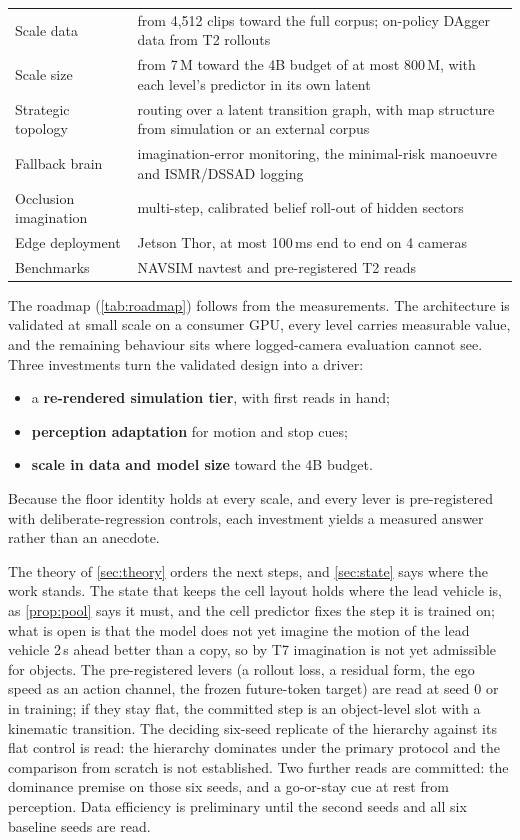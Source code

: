 \documentclass[10pt,twocolumn]{article}
\theoremstyle{remark}
\begin{document}
\begin{table}[t]
\begin{tabularx}{\columnwidth}{@{}>{\raggedright\arraybackslash}p{24mm}>{\raggedright\arraybackslash}X@{}}
Scale data & from 4,512 clips toward the full corpus; on-policy DAgger data from T2 rollouts \\
Scale size & from 7\,M toward the 4B budget of at most 800\,M, with each level's predictor in its own latent \\
Strategic topology & routing over a latent transition graph, with map structure from simulation or an external corpus \\
Fallback brain & imagination-error monitoring, the minimal-risk manoeuvre and ISMR/DSSAD logging \\
Occlusion imagination & multi-step, calibrated belief roll-out of hidden sectors \\
Edge deployment & Jetson Thor, at most 100\,ms end to end on 4 cameras \\
Benchmarks & NAVSIM navtest and pre-registered T2 reads \\
\bottomrule
\end{tabularx}
\end{table}

The roadmap (\cref{tab:roadmap}) follows from the measurements. The architecture is validated at small scale on a consumer GPU,
every level carries measurable value, and the remaining behaviour sits where logged-camera evaluation cannot see. Three investments
turn the validated design into a driver:
\begin{itemize}
  \item a \textbf{re-rendered simulation tier}, with first reads in hand;
  \item \textbf{perception adaptation} for motion and stop cues;
  \item \textbf{scale in data and model size} toward the 4B budget.
\end{itemize}
Because the floor identity holds at every scale, and every lever is pre-registered with deliberate-regression controls, each
investment yields a measured answer rather than an anecdote.

The theory of \cref{sec:theory} orders the next steps, and \cref{sec:state} says where the work stands. The state that keeps the
cell layout holds where the lead vehicle is, as \cref{prop:pool} says it must, and the cell predictor fixes the step it is trained
on; what is open is that the model does not yet imagine the motion of the lead vehicle 2\,s ahead better than a copy, so by T7
imagination is not yet admissible for objects. The pre-registered levers (a rollout loss, a residual form, the ego speed as an
action channel, the frozen future-token target) are read at seed 0 or in training; if they stay flat, the committed step is an
object-level slot with a kinematic transition. The deciding six-seed replicate of the hierarchy against its flat control is read: the hierarchy dominates under the primary
protocol and the comparison from scratch is not established. Two further reads are committed: the
dominance premise on those six seeds, and a go-or-stay cue at rest from perception. Data efficiency is preliminary until the
second seeds and all six baseline seeds are read.
\end{document}
